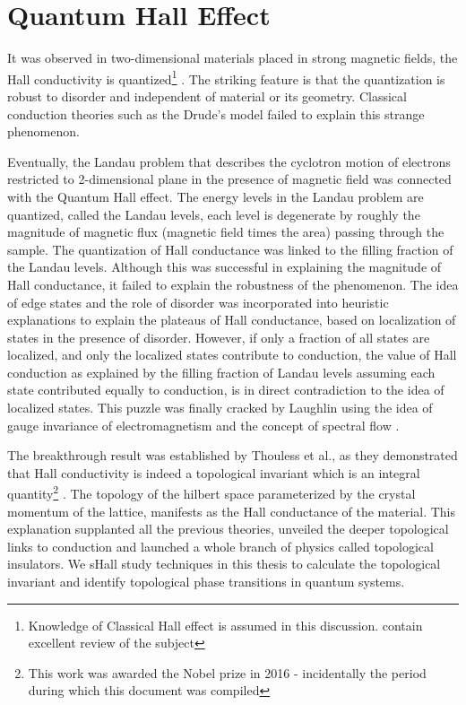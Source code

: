 %

\chapter{Quantum Hall Effect}\label{ch:qhe}
It was observed in two-dimensional materials placed in strong magnetic fields, the Hall conductivity is quantized\footnote{Knowledge of Classical Hall effect is assumed in this discussion.
\parencite{kitel1971introduction,tong2016lectures,jain2007composite} contain excellent review of the subject} \cite{klitzing1980new, prange1990quantum, jain2007composite}. The striking feature is that the quantization is robust to disorder and independent of
material or its geometry. Classical conduction theories such as the Drude's model failed to explain this strange phenomenon. 

Eventually, the Landau problem that describes the cyclotron motion of electrons restricted to 2-dimensional plane in the presence of magnetic field was connected with the Quantum Hall effect. 
The energy levels in the Landau problem are quantized, called the Landau levels, each level is degenerate by roughly the magnitude of magnetic flux (magnetic field times the area) passing 
through the sample. The quantization of Hall conductance was linked to the filling fraction of the Landau levels. Although this was successful in explaining the magnitude of Hall
conductance, it failed to explain the robustness of the phenomenon. The idea of edge states and the role of disorder was incorporated into heuristic explanations to explain the plateaus of Hall conductance, based on localization
of states in the presence of disorder. However, if only a fraction of all states are localized, and only the localized states contribute to conduction, the value of Hall conduction as explained
by the filling fraction of Landau levels assuming each state contributed equally to conduction, is in direct contradiction to the idea of localized states. This puzzle was finally cracked by 
Laughlin using the idea of gauge invariance of electromagnetism and the concept of spectral flow \cite{laughlin1981quantized, prange1981quantized, halperin1982quantized, jain2007composite, tong2016lectures}.

The breakthrough result was established by Thouless et al., as they demonstrated that Hall conductivity is indeed a topological invariant which is an integral quantity\footnote{This work was awarded the Nobel prize in 2016 - incidentally the period during which this document was compiled} \cite{thouless1982quantized,kohmoto1985topological,simon1983holonomy}. The topology of the hilbert space parameterized by 
the crystal momentum of the lattice, manifests as the Hall conductance of the material. This explanation supplanted all the previous theories, unveiled the deeper topological links to conduction
and launched a whole branch of physics called topological insulators. We sHall study techniques in this thesis to calculate the topological invariant and identify topological phase transitions
in quantum systems.

